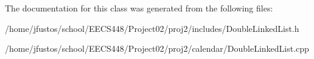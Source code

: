 The documentation for this class was generated from the following files\-:\begin{DoxyCompactItemize}
\item 
/home/jfustos/school/\-E\-E\-C\-S448/\-Project02/proj2/includes/Double\-Linked\-List.\-h\item 
/home/jfustos/school/\-E\-E\-C\-S448/\-Project02/proj2/calendar/Double\-Linked\-List.\-cpp\end{DoxyCompactItemize}
